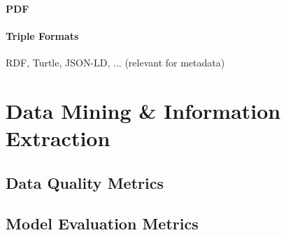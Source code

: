 \paragraph{PDF}

\paragraph{Triple Formats}
RDF, Turtle, JSON-LD, ... (relevant for metadata)



\section{Data Mining \& Information Extraction}


\subsection{Data Quality Metrics}

\subsection{Model Evaluation Metrics}
